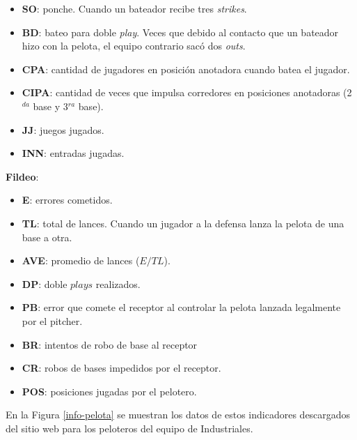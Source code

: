 \begin{itemize}
	\item \textbf{SO}: ponche. Cuando un bateador recibe tres \textit{strikes}.
	\item \textbf{BD}: bateo para doble \textit{play}. Veces que debido al contacto que un bateador hizo con la pelota, el equipo contrario sacó dos \textit{outs}.
	\item \textbf{CPA}: cantidad de jugadores en posición anotadora cuando batea el jugador.
	\item \textbf{CIPA}: cantidad de veces que impulsa corredores en posiciones anotadoras (2$^{da}$ base y 3$^{ra}$ base).
	\item \textbf{JJ}: juegos jugados.
	\item \textbf{INN}: entradas jugadas.
\end{itemize}
\large{\textbf{Fildeo}:}
\normalsize
\begin{itemize}
		\setlength\itemsep{0em}
	\item \textbf{E}: errores cometidos.
	\item \textbf{TL}: total de lances. Cuando un jugador a la defensa lanza la pelota de una base a otra. 
	\item \textbf{AVE}: promedio de lances ($E/TL$).
	\item \textbf{DP}: doble $ plays $ realizados.
	\item \textbf{PB}: error que comete el receptor al controlar la pelota lanzada legalmente por el pitcher.
	\item \textbf{BR}: intentos de robo de base al receptor
	\item \textbf{CR}: robos de bases impedidos por el receptor.
	\item \textbf{POS}: posiciones jugadas por el pelotero.
\end{itemize}

En la Figura \ref{info-pelota} se muestran los datos de estos indicadores descargados del sitio web para los peloteros del equipo de Industriales.


\newpage
{}
\recalctypearea
\null\vfill
\pagestyle{plain}

